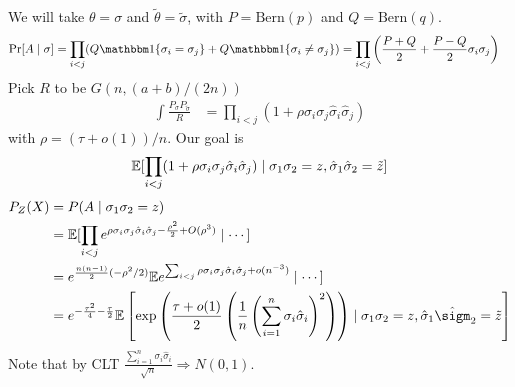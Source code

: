 \begin{theorem}
    We will take $\theta = \sigma$ and $\tilde\theta = \tilde\sigma$,
    with $P = \text{Bern}(p)$ and $Q = \text{Bern}(q)$.
    \begin{align}
      \Pr[A \mid \sigma]
      &= \prod_{i < j} (Q \ind\{\sigma_i = \sigma_j\} + Q \ind\{\sigma_i \neq \sigma_j\})
      = \prod_{i < j} \left( \frac{P+Q}{2}  + \frac{P-Q}{2} \sigma_i \sigma_j\right)
    \end{align}
    Pick $R$ to be $G(n, (a+b)/(2n))$
    \begin{align}
      \int \frac{P_\sigma P_{\tilde{\sigma}}}{R}
      &= \prod_{i < j} (1 + \rho \sigma_i \sigma_j \hat\sigma_i \hat\sigma_j)
    \end{align}
    with $\rho = (\tau + o(1)) / n$. Our goal is
    \begin{align}
      \mathbb{E}[\prod_{i < j} (1 + \rho \sigma_i \sigma_j \hat\sigma_i \hat\sigma_j)
        \mid \sigma_1 \sigma_2 = z, \hat\sigma_1 \hat\sigma_2 = \tilde{z}]
    \end{align}
    \begin{align}
      P_Z(X) &= P(A \mid \sigma_1 \sigma_2 = z) \\
             &= \ex[\prod_{i < j} e^{\rho \sigma_i \sigma_j \hat\sigma_i \hat\sigma_j - \frac{\rho^2}{2}  + O(\rho^3)} \mid \cdots ] \\
             &= e^{\frac{n(n-1)}{2} (-\rho^2 / 2)} \ex e^{\sum_{i < j} \rho \sigma_i \sigma_j \hat\sigma_i \hat\sigma_j + o(n^{-3})} \mid \cdots] \\
             &= e^{-\frac{\tau^2}{4}  - \frac{\tau}{2}}
             \ex\left[ \exp\left(
               \frac{\tau + o(1)}{2} \left(
                 \frac{1}{n} \left(
                   \sum_{i=1}^n \sigma_i \hat\sigma_i
               \right)^2\right)
             \right)
           \mid \sigma_1 \sigma_2 = z, \hat\sigma_1 \hat\sigm_2 = \tilde{z} \right]
    \end{align}
  Note that by CLT $\frac{\sum_{i=1}^n \sigma_i \hat\sigma_i}{\sqrt{n}} \Rightarrow N(0,1)$.
\end{theorem}
